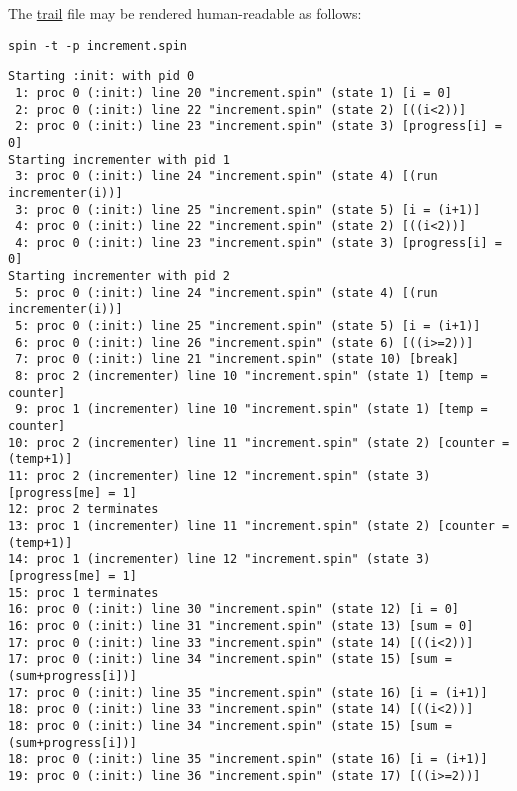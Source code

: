 The \url{trail} file may be rendered human-readable as follows:

\vspace{5pt}
\begin{minipage}[t]{\columnwidth}
\begin{verbatim}
spin -t -p increment.spin
\end{verbatim}
\end{minipage}
\vspace{5pt}

\begin{figure*}[htbp]
{ \scriptsize
\begin{verbatim}
Starting :init: with pid 0
 1: proc 0 (:init:) line 20 "increment.spin" (state 1) [i = 0]
 2: proc 0 (:init:) line 22 "increment.spin" (state 2) [((i<2))]
 2: proc 0 (:init:) line 23 "increment.spin" (state 3) [progress[i] = 0]
Starting incrementer with pid 1
 3: proc 0 (:init:) line 24 "increment.spin" (state 4) [(run incrementer(i))]
 3: proc 0 (:init:) line 25 "increment.spin" (state 5) [i = (i+1)]
 4: proc 0 (:init:) line 22 "increment.spin" (state 2) [((i<2))]
 4: proc 0 (:init:) line 23 "increment.spin" (state 3) [progress[i] = 0]
Starting incrementer with pid 2
 5: proc 0 (:init:) line 24 "increment.spin" (state 4) [(run incrementer(i))]
 5: proc 0 (:init:) line 25 "increment.spin" (state 5) [i = (i+1)]
 6: proc 0 (:init:) line 26 "increment.spin" (state 6) [((i>=2))]
 7: proc 0 (:init:) line 21 "increment.spin" (state 10) [break]
 8: proc 2 (incrementer) line 10 "increment.spin" (state 1) [temp = counter]
 9: proc 1 (incrementer) line 10 "increment.spin" (state 1) [temp = counter]
10: proc 2 (incrementer) line 11 "increment.spin" (state 2) [counter = (temp+1)]
11: proc 2 (incrementer) line 12 "increment.spin" (state 3) [progress[me] = 1]
12: proc 2 terminates
13: proc 1 (incrementer) line 11 "increment.spin" (state 2) [counter = (temp+1)]
14: proc 1 (incrementer) line 12 "increment.spin" (state 3) [progress[me] = 1]
15: proc 1 terminates
16: proc 0 (:init:) line 30 "increment.spin" (state 12)	[i = 0]
16: proc 0 (:init:) line 31 "increment.spin" (state 13)	[sum = 0]
17: proc 0 (:init:) line 33 "increment.spin" (state 14)	[((i<2))]
17: proc 0 (:init:) line 34 "increment.spin" (state 15)	[sum = (sum+progress[i])]
17: proc 0 (:init:) line 35 "increment.spin" (state 16)	[i = (i+1)]
18: proc 0 (:init:) line 33 "increment.spin" (state 14)	[((i<2))]
18: proc 0 (:init:) line 34 "increment.spin" (state 15)	[sum = (sum+progress[i])]
18: proc 0 (:init:) line 35 "increment.spin" (state 16)	[i = (i+1)]
19: proc 0 (:init:) line 36 "increment.spin" (state 17)	[((i>=2))]

\end{verbatim}}
\end{figure*}
